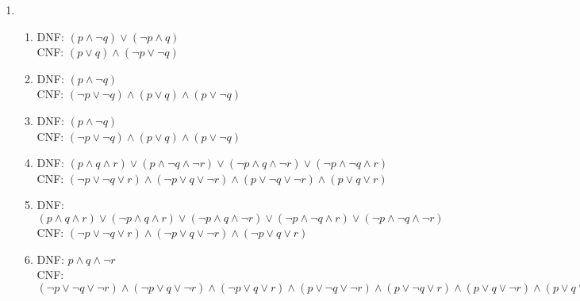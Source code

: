 \documentclass[a4paper]{article}
\newcommand{\exercise}{\item}
\begin{document}
\begin{enumerate}
\begin{enumerate} [label=(\alph*)]
		\item La \href{https://www.wolframalpha.com/input?i=%28%28p+and+q%29+%3D%3E+r%29%3C%3D%3E+%28p+%3D%3E+%28q+%3D%3Er%29%29}{tabla de verdad} revela que es una tautología. Por lo tanto, son equivalentes. Esta regla de equivalencia se llama Exportación.
		\item La \href{https://www.wolframalpha.com/input?i=not+%28%28p+and+q%29+%3D%3E+not+r%29+%3C%3D%3E++%28%28p+and+q%29+or+r%29}{tabla de verdad} revela que es una contingencia. Por lo tanto, no son equivalentes. 
		\item La \href{https://www.wolframalpha.com/input?i=%28%28p+or+q+%29+%3D%3E++r%29+%3C%3D%3E+%28+%28p+%3D%3E+r%29+and+%28q+%3D%3E+r%29+%29}{tabla de verdad} revela que es una tautología. Por lo tanto, son equivalentes. Esta regla de equivalencia se llama Demostración por casos.
		\item La \href{https://www.wolframalpha.com/input?i=truth+table%3A+%28p+%3D%3E+%28q+and+r+and+s%29%29+%3C%3D%3E+%28%28p+%3D%3E+q%29+and+%28p+%3D%3E+r%29+and+%28p+%3D%3E+s%29%29}{tabla de verdad} revela que es una tautología. Por lo tanto, son equivalentes. Esta regla de equivalencia no tiene nombre.
\end{enumerate}\exercise\begin{enumerate} [label=(\alph*)]		\item DNF: $(p\land \neg q) \lor  (\neg p\land q)$ \\ CNF: $(p\lor q) \land  (\neg p\lor \neg q)$
		\item DNF: $(p\land \neg q)$  \\ CNF: $(\neg p\lor \neg q) \land  (p\lor q) \land  (p\lor \neg q)$
		\item DNF: $(p\land \neg q)$  \\ CNF: $(\neg p\lor \neg q) \land  (p\lor q) \land  (p\lor \neg q)$
		\item DNF: $(p\land q\land r) \lor  (p\land \neg q\land \neg r) \lor  (\neg p\land q\land \neg r) \lor  (\neg p\land \neg q\land r)$  \\ CNF: $(\neg p\lor \neg q\lor r) \land  (\neg p\lor q\lor \neg r) \land  (p\lor \neg q\lor \neg r) \land  (p\lor q\lor r)$
		\item DNF: $(p\land q\land r) \lor  (\neg p\land q\land r) \lor  (\neg p\land q\land \neg r) \lor  (\neg p\land \neg q\land r) \lor  (\neg p\land \neg q\land \neg r)$  \\ CNF: $(\neg p\lor \neg q\lor r) \land  (\neg p\lor q\lor \neg r) \land  (\neg p\lor q\lor r)$
		\item DNF: $p \land q \land \neg r$ \\ CNF: $(\neg p \lor \neg q \lor \neg r)\land (\neg p \lor q \lor \neg r)\land (\neg p \lor q \lor r)\land (p \lor \neg q \lor \neg r)\land (p \lor \neg q \lor r)\land (p \lor q \lor \neg r)\land (p \lor q \lor r)$

\end{enumerate}
\end{enumerate}
\end{document}
